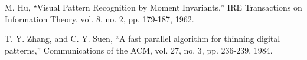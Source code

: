 \documentclass[12pt,a4paper]{article}
\theoremstyle{definition}
\theoremstyle{theorem}
\theoremstyle{definition}
\begin{document}
\newpage






\small


\begin{thebibliography}{99}

\begin{LTRitems}

\resetlatinfont

M. Hu, “Visual Pattern Recognition by Moment Invariants,” IRE Transactions on Information Theory, vol. 8, no. 2, pp. 179-187, 1962.

T. Y. Zhang,  and C. Y. Suen, “A fast parallel algorithm for thinning digital patterns,” Communications of the ACM, vol. 27, no. 3, pp. 236-239, 1984.

\end{LTRitems}

\end{thebibliography}
\end{document}
